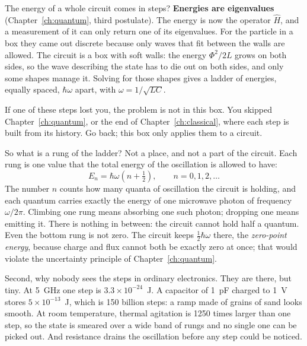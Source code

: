 \begin{reflection}{The energy of a whole circuit comes in steps?}
\textbf{Energies are eigenvalues} (Chapter~\ref{ch:quantum}, third postulate). The
energy is now the operator $\hat H$, and a measurement of it can only return one of
its eigenvalues. For the particle in a box they came out discrete because only waves
that fit between the walls are allowed. The circuit is a box with soft walls: the
energy $\Phi^2/2L$ grows on both sides, so the wave describing the state has to die
out on both sides, and only some shapes manage it. Solving for those shapes gives a
ladder of energies, equally spaced, $\hbar\omega$ apart, with
$\omega = 1/\sqrt{LC}$.

If one of these steps lost you, the problem is not in this box. You skipped
Chapter~\ref{ch:quantum}, or the end of Chapter~\ref{ch:classical}, where each step is
built from its history. Go back; this box only applies them to a circuit.

So what is a rung of the ladder? Not a place, and not a part of the circuit. Each rung
is one value that the total energy of the oscillation is allowed to have:
\[
  E_n = \hbar\omega\left(n + \tfrac12\right), \qquad n = 0, 1, 2, \dots
\]
The number $n$ counts how many quanta of oscillation the circuit is holding, and each
quantum carries exactly the energy of one microwave photon of frequency $\omega/2\pi$.
Climbing one rung means absorbing one such photon; dropping one means emitting it. There
is nothing in between: the circuit cannot hold half a quantum. Even the bottom rung is not
zero. The circuit keeps $\tfrac12\hbar\omega$ there, the \emph{zero-point energy}, because
charge and flux cannot both be exactly zero at once; that would violate the uncertainty
principle of Chapter~\ref{ch:quantum}.

Second, why nobody sees the steps in ordinary electronics. They are there, but tiny.
At 5~GHz one step is $3.3\times10^{-24}$~J. A capacitor of 1~pF charged to 1~V stores
$5\times10^{-13}$~J, which is 150 billion steps: a ramp made of grains of sand looks
smooth. At room temperature, thermal agitation is 1250 times larger than one step, so
the state is smeared over a wide band of rungs and no single one can be picked out. And
resistance drains the oscillation before any step could be noticed.


\end{reflection}
